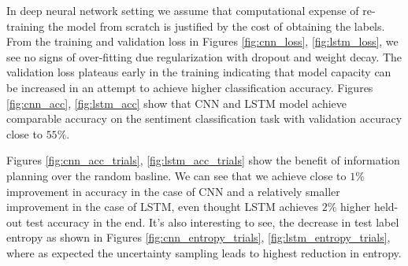 In deep neural network setting we assume that computational expense of re-training the model from scratch is justified by the cost of obtaining the labels. From the training and validation loss in Figures \ref{fig:cnn_loss}, \ref{fig:lstm_loss}, we see no signs of over-fitting due regularization with dropout and weight decay. The validation loss plateaus early in the training indicating that model capacity can be increased in an attempt to achieve higher classification accuracy. Figures \ref{fig:cnn_acc}, \ref{fig:lstm_acc} show that CNN and LSTM model achieve comparable accuracy on the sentiment classification task with validation accuracy close to $55\%$.     

Figures \ref{fig:cnn_acc_trials}, \ref{fig:lstm_acc_trials} show the benefit of information planning over the random basline. We can see that we achieve close to $1\%$ improvement in accuracy in the case of CNN and a relatively smaller improvement in the case of LSTM, even thought LSTM achieves $2\%$ higher held-out test accuracy in the end. It's also interesting to see, the decrease in test label entropy as shown in Figures \ref{fig:cnn_entropy_trials}, \ref{fig:lstm_entropy_trials}, where as expected the uncertainty sampling leads to highest reduction in entropy. 
 
